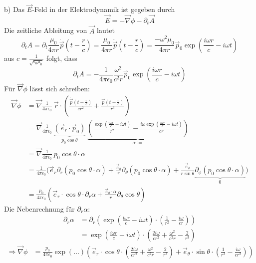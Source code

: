 \documentclass[11pt a4paper]{article}
\newcommand{\delr}{\partial_r}
\newcommand{\delt}{\partial_t}
\newcommand{\epsz}{\epsilon_0}
\newcommand{\kco}{\frac{1}{4\pi\epsilon_0}}
\newcommand{\del}{\partial}
\newcommand{\grad}{\vec \nabla}
\begin{document}
\newpage
b) Das $\vec E$-Feld in der Elektrodynamik ist gegeben durch 
\[ \vec E = -\grad \phi - \delt \vec A \]
Die zeitliche Ableitung von $\vec A$ lautet
\[ \delt A 
	= \delt \frac{\mu_0}{4\pi r} \dot{\vec p} \left(t - \frac rc\right) 
	= \frac{\mu_0}{4\pi r} \ddot{\vec p} \left(t - \frac rc\right) 
	= \frac{-\omega^2 \mu_0}{4\pi r} \vec p_0 \exp\left(\frac{i\omega r}{c} - i\omega t \right)
\]
aus $c = \frac{1}{\sqrt{\epsz \mu_0}}$ folgt, dass
\[ \delt A 
	= - \frac{1}{4\pi\epsz} \frac{\omega^2}{c^2 r} \vec p_0 \exp\left(\frac{i\omega r}{c} - i\omega t \right)
	\tag{2.1}
\]
Für $\grad \phi$ lässt sich schreiben:
\begin{align*}
	\grad \phi
	&= \grad
		\frac{1}{4\pi\epsz}  \ \vec r \cdot 
		\left(
			\frac{\dot{\vec p} \left(t - \frac rc \right)}{cr^2} 
			+ \frac{\vec p\left( t - \frac rc \right)}{r^3}
		\right) \\
	&= \grad
		\frac{1}{4\pi\epsz}  \
		\underbrace{(\vec e_r \cdot \vec p_0)}_{p_0 \cos\theta} \
		\underbrace{\left(
			\frac{\exp\left(\frac{i\omega r}{c} - i\omega t \right)}{r^2}
			-
			\frac{i\omega \exp\left(\frac{i\omega r}{c} - i\omega t \right)}{cr}
		\right)}_{\alpha :=} \\
	&= \grad
		\frac{1}{4\pi\epsz} \ p_0 \cos\theta \cdot  \alpha \\
	&= \kco \Big( 
	\vec e_r \delr \left(p_0 \cos\theta \cdot \alpha \right) +
	\frac{\vec e_\theta}{r} \del_\theta \left(p_0 \cos\theta \cdot \alpha \right)
	+ \frac{\vec e_\phi}{r\sin\theta} 
	\underbrace{\del_\phi \left(p_0 \cos\theta \cdot \alpha \right)}_{0}
	\Big) \\
	&= \frac{p_0}{4\pi\epsz} \left(
		\vec e_r \cdot \cos\theta \cdot \delr\alpha 
		+
		\frac{\vec e_\theta \cdot \alpha}{r} \del_\theta \cos\theta
	\right)
\end{align*}
Die Nebenrechnung für $\delr \alpha$:
\begin{align*}
	\delr \alpha 
	&= \delr \left(\exp\left(\frac{i\omega r}{c} - i\omega t \right) \cdot
		\left(\frac{1}{r^2} - \frac{i\omega}{cr} \right)
	\right) \\
	&= 
		\exp\left(\frac{i\omega r}{c} - i\omega t \right) 
		\cdot \left(\frac{2i\omega}{cr^2} + \frac{\omega^2}{c^2r} -\frac{2}{r^3} \right)
\end{align*}
\begin{align*}
	\Rightarrow
	\grad \phi
	&= \frac{p_0}{4\pi\epsz} \exp(\hdots)
	\left(
		\vec e_r \cdot \cos\theta \cdot 
		\left(\frac{2i\omega}{cr^2} + \frac{\omega^2}{c^2r} -\frac{2}{r^3} \right)
		+
		\vec e_\theta \cdot \sin\theta \cdot \left(\frac{1}{r^3} - \frac{i\omega}{cr^2} \right)
	\right)
\end{align*}
\end{document}
